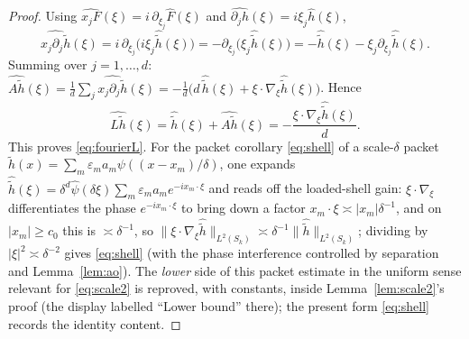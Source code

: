 \documentclass[11pt]{article}
\theoremstyle{remark}
\newcommand{\norm}[1]{\lVert #1\rVert}
\newcommand{\abs}[1]{\lvert #1\rvert}
\begin{document}
\begin{proof}
Using $\widehat{x_j F}(\xi)=i\,\partial_{\xi_j}\widehat F(\xi)$ and
$\widehat{\partial_j h}(\xi)=i\xi_j\widehat h(\xi)$,
\[
\widehat{x_j\partial_j \tilde h}(\xi)
=i\,\partial_{\xi_j}\bigl(i\xi_j\widehat{\tilde h}(\xi)\bigr)
=-\partial_{\xi_j}\bigl(\xi_j\widehat{\tilde h}(\xi)\bigr)
=-\widehat{\tilde h}(\xi)-\xi_j\partial_{\xi_j}\widehat{\tilde h}(\xi).
\]
Summing over $j=1,\dots,d$:
$\widehat{A\tilde h}(\xi)=\frac1d\sum_j\widehat{x_j\partial_j\tilde h}(\xi)
=-\frac1d\bigl(d\,\widehat{\tilde h}(\xi)+\xi\cdot\nabla_\xi
\widehat{\tilde h}(\xi)\bigr)$. Hence
\[
\widehat{L\tilde h}(\xi)
=\widehat{\tilde h}(\xi)+\widehat{A\tilde h}(\xi)
=-\frac{\xi\cdot\nabla_{\xi}\widehat{\tilde h}(\xi)}{d}.
\]
This proves \eqref{eq:fourierL}. For the packet corollary \eqref{eq:shell}
of a scale-$\delta$ packet $\tilde h(x)=\sum_m\varepsilon_m a_m
\psi((x-x_m)/\delta)$, one expands
$\widehat{\tilde h}(\xi)=\delta^{d}\widehat\psi(\delta\xi)\sum_m
\varepsilon_m a_m e^{-ix_m\cdot\xi}$ and reads off the loaded-shell gain:
$\xi\cdot\nabla_\xi$ differentiates the phase $e^{-ix_m\cdot\xi}$ to bring
down a factor $x_m\cdot\xi\asymp\abs{x_m}\delta^{-1}$, and on
$\abs{x_m}\ge c_0$ this is $\asymp\delta^{-1}$, so
$\norm{\xi\cdot\nabla_\xi\widehat{\tilde h}}_{L^2(S_k)}
\asymp\delta^{-1}\norm{\widehat{\tilde h}}_{L^2(S_k)}$; dividing by
$\abs\xi^2\asymp\delta^{-2}$ gives \eqref{eq:shell} (with the phase
interference controlled by separation and Lemma~\ref{lem:ao}). The
\emph{lower} side of this packet estimate in the uniform sense relevant
for \eqref{eq:scale2} is reproved, with constants, inside
Lemma~\ref{lem:scale2}'s proof (the display labelled ``Lower bound''
there); the present form \eqref{eq:shell} records the identity content.
\end{proof}
\end{document}
